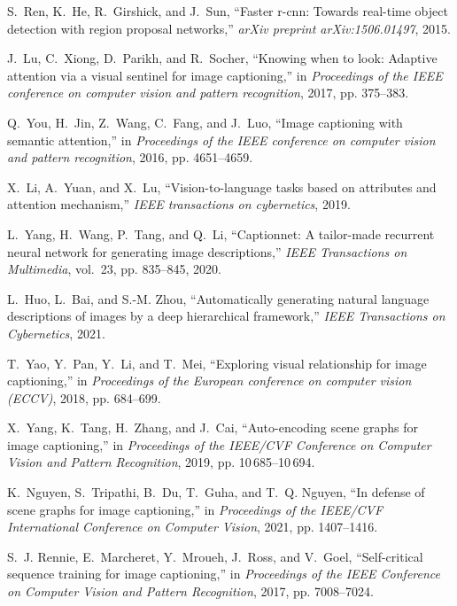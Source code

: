 \documentclass[journal]{IEEEtran}
\begin{document}
\begin{thebibliography}{10}
S.~Ren, K.~He, R.~Girshick, and J.~Sun, ``Faster r-cnn: Towards real-time
  object detection with region proposal networks,'' \emph{arXiv preprint
  arXiv:1506.01497}, 2015.

J.~Lu, C.~Xiong, D.~Parikh, and R.~Socher, ``Knowing when to look: Adaptive
  attention via a visual sentinel for image captioning,'' in \emph{Proceedings
  of the IEEE conference on computer vision and pattern recognition}, 2017, pp.
  375--383.

Q.~You, H.~Jin, Z.~Wang, C.~Fang, and J.~Luo, ``Image captioning with semantic
  attention,'' in \emph{Proceedings of the IEEE conference on computer vision
  and pattern recognition}, 2016, pp. 4651--4659.

X.~Li, A.~Yuan, and X.~Lu, ``Vision-to-language tasks based on attributes and
  attention mechanism,'' \emph{IEEE transactions on cybernetics}, 2019.

L.~Yang, H.~Wang, P.~Tang, and Q.~Li, ``Captionnet: A tailor-made recurrent
  neural network for generating image descriptions,'' \emph{IEEE Transactions
  on Multimedia}, vol.~23, pp. 835--845, 2020.

L.~Huo, L.~Bai, and S.-M. Zhou, ``Automatically generating natural language
  descriptions of images by a deep hierarchical framework,'' \emph{IEEE
  Transactions on Cybernetics}, 2021.

T.~Yao, Y.~Pan, Y.~Li, and T.~Mei, ``Exploring visual relationship for image
  captioning,'' in \emph{Proceedings of the European conference on computer
  vision (ECCV)}, 2018, pp. 684--699.

X.~Yang, K.~Tang, H.~Zhang, and J.~Cai, ``Auto-encoding scene graphs for image
  captioning,'' in \emph{Proceedings of the IEEE/CVF Conference on Computer
  Vision and Pattern Recognition}, 2019, pp. 10\,685--10\,694.

K.~Nguyen, S.~Tripathi, B.~Du, T.~Guha, and T.~Q. Nguyen, ``In defense of scene
  graphs for image captioning,'' in \emph{Proceedings of the IEEE/CVF
  International Conference on Computer Vision}, 2021, pp. 1407--1416.

S.~J. Rennie, E.~Marcheret, Y.~Mroueh, J.~Ross, and V.~Goel, ``Self-critical
  sequence training for image captioning,'' in \emph{Proceedings of the IEEE
  Conference on Computer Vision and Pattern Recognition}, 2017, pp. 7008--7024.


\end{thebibliography}
\end{document}
